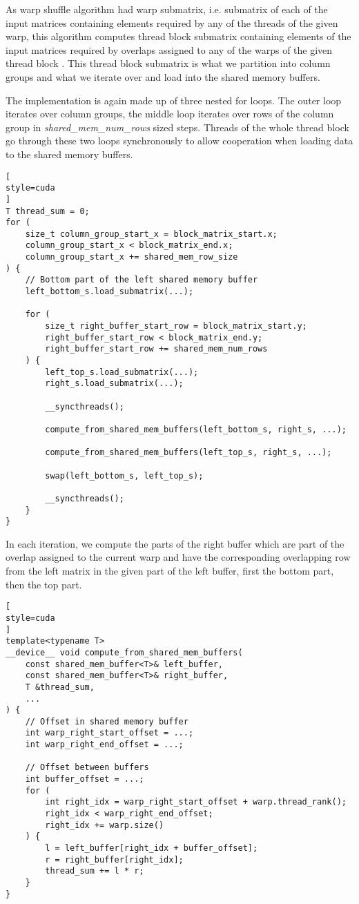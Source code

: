 As warp shuffle algorithm had warp submatrix, i.e. submatrix of each of the input matrices containing elements required by any of the threads of the given warp, this algorithm computes thread block submatrix containing elements of the input matrices required by overlaps assigned to any of the warps of the given thread block . This thread block submatrix is what we partition into column groups and what we iterate over and load into the shared memory buffers.

The implementation is again made up of three nested for loops. The outer loop iterates over column groups, the middle loop iterates over rows of the column group in \textit{shared\_mem\_num\_rows} sized steps. Threads of the whole thread block go through these two loops synchronously to allow cooperation when loading data to the shared memory buffers. 

\begin{lstlisting}[
style=cuda
]
T thread_sum = 0;
for (
	size_t column_group_start_x = block_matrix_start.x;
	column_group_start_x < block_matrix_end.x;
	column_group_start_x += shared_mem_row_size
) {
	// Bottom part of the left shared memory buffer
	left_bottom_s.load_submatrix(...);
	
	for (
		size_t right_buffer_start_row = block_matrix_start.y;
		right_buffer_start_row < block_matrix_end.y;
		right_buffer_start_row += shared_mem_num_rows
	) {
		left_top_s.load_submatrix(...);
		right_s.load_submatrix(...);
		
		__syncthreads();
		
		compute_from_shared_mem_buffers(left_bottom_s, right_s, ...);
		
		compute_from_shared_mem_buffers(left_top_s, right_s, ...);
		
		swap(left_bottom_s, left_top_s);
		
		__syncthreads();
	}
}
\end{lstlisting}


In each iteration, we compute the parts of the right buffer which are part of the overlap assigned to the current warp and have the corresponding overlapping row from the left matrix in the given part of the left buffer, first the bottom part, then the top part.  %

\begin{lstlisting}[
style=cuda
]
template<typename T>
__device__ void compute_from_shared_mem_buffers(
	const shared_mem_buffer<T>& left_buffer,
	const shared_mem_buffer<T>& right_buffer,
	T &thread_sum,
	...
) {
	// Offset in shared memory buffer
	int warp_right_start_offset = ...;
	int warp_right_end_offset = ...;
	
	// Offset between buffers
	int buffer_offset = ...;
	for (
		int right_idx = warp_right_start_offset + warp.thread_rank();
		right_idx < warp_right_end_offset;
		right_idx += warp.size()
	) {
		l = left_buffer[right_idx + buffer_offset];
		r = right_buffer[right_idx];
		thread_sum += l * r; 
	}
}
\end{lstlisting}

